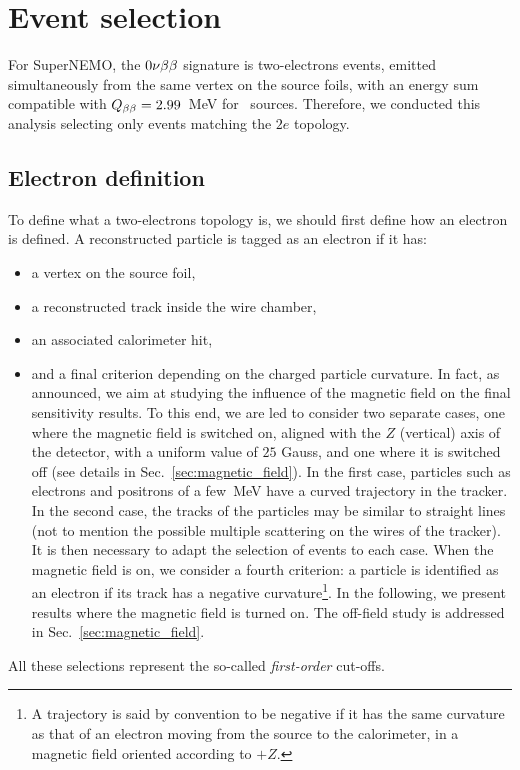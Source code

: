 \section{Event selection}
\label{sec:sensitivity_ev_selection}

For SuperNEMO, the $0\nu\beta\beta$ signature is two-electrons events, emitted simultaneously from the same vertex on the source foils, with an energy sum compatible with $Q_{\beta\beta} = 2.99$~MeV for \Se\ sources.
Therefore, we conducted this analysis selecting only events matching the $2e$ topology.

\subsection{Electron definition}

To define what a two-electrons topology is, we should first define how an electron is defined.
A reconstructed particle is tagged as an electron if it has:
\begin{itemize}
\item a vertex on the source foil,
\item a reconstructed track inside the wire chamber,
\item an associated calorimeter hit,
\item and a final criterion depending on the charged particle curvature.
  In fact, as announced, we aim at studying the influence of the magnetic field on the final sensitivity results.
  To this end, we are led to consider two separate cases, one where the magnetic field is switched on, aligned with the $Z$ (vertical) axis of the detector, with a uniform value of $25$ Gauss, and one where it is switched off (see details in Sec.~\ref{sec:magnetic_field}).
  In the first case, particles such as electrons and positrons of a few~MeV have a curved trajectory in the tracker.
  In the second case, the tracks of the particles may be similar to straight lines (not to mention the possible multiple scattering on the wires of the tracker).
  It is then necessary to adapt the selection of events to each case.
  When the magnetic field is on, we consider a fourth criterion: a particle is identified as an electron if its track has a negative curvature\footnote{A trajectory is said by convention to be negative if it has the same curvature as that of an electron moving from the source to the calorimeter, in a magnetic field oriented according to $+Z$.}.
  In the following, we present results where the magnetic field is turned on.
  The off-field study is addressed in Sec.~\ref{sec:magnetic_field}.
\end{itemize}
All these selections represent the so-called \emph{first-order} cut-offs.

